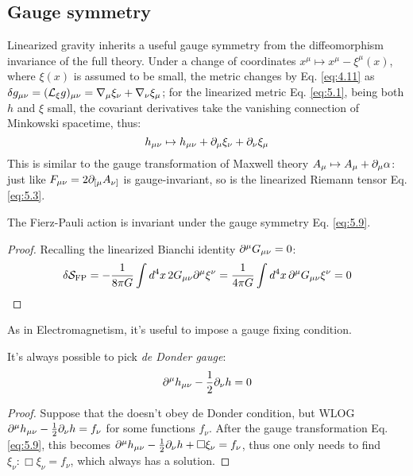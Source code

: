 \subsection{Gauge symmetry}

Linearized gravity inherits a useful gauge symmetry from the diffeomorphism invariance of the full theory. Under a change of coordinates $ x^\mu \mapsto x^\mu - \xi^\mu(x) $, where $ \xi(x) $ is assumed to be small, the metric changes by Eq. \ref{eq:4.11} as $ \delta g_{\mu \nu} = (\mathcal{L}_\xi g)_{\mu \nu} = \nabla_\mu \xi_\nu + \nabla_\nu \xi_\mu $; for the linearized metric Eq. \ref{eq:5.1}, being both $ h $ and $ \xi $ small, the covariant derivatives take the vanishing connection of Minkowski spacetime, thus:
\begin{equation}
  h_{\mu \nu} \mapsto h_{\mu \nu} + \partial_\mu \xi_\nu + \partial_\nu \xi_\mu
  \label{eq:5.9}
\end{equation}
This is similar to the gauge transformation of Maxwell theory $ A_\mu \mapsto A_\mu + \partial_\mu \alpha $: just like $ F_{\mu \nu} = 2 \partial_{[\mu} A_{\nu]} $ is gauge-invariant, so is the linearized Riemann tensor Eq. \ref{eq:5.3}.

\begin{proposition}
  The Fierz-Pauli action is invariant under the gauge symmetry Eq. \ref{eq:5.9}.
\end{proposition}
\begin{proof}
  Recalling the linearized Bianchi identity $ \partial^\mu G_{\mu \nu} = 0 $:
  \begin{equation*}
    \delta \mathcal{S}_{\text{FP}} = - \frac{1}{8\pi G} \int d^4 x\, 2 G_{\mu \nu} \partial^\mu \xi^\nu = \frac{1}{4\pi G} \int d^4 x\, \partial^\mu G_{\mu \nu} \xi^\nu = 0
  \end{equation*}
\end{proof}

As in Electromagnetism, it's useful to impose a gauge fixing condition.

\begin{proposition}
  It's always possible to pick \textit{de Donder gauge}:
  \begin{equation}
    \partial^\mu h_{\mu \nu} - \frac{1}{2} \partial_\nu h = 0
    \label{eq:5.10}
  \end{equation}
\end{proposition}
\begin{proof}
  Suppose that the doesn't obey de Donder condition, but WLOG $ \partial^\mu h_{\mu \nu} - \frac{1}{2} \partial_\nu h = f_\nu $ for some functions $ f_\nu $. After the gauge transformation Eq. \ref{eq:5.9}, this becomes $ \partial^\mu h_{\mu \nu} - \frac{1}{2} \partial_\nu h + \Box \xi_\nu = f_\nu $, thus one only needs to find $ \xi_\nu : \Box \xi_\nu = f_\nu $, which always has a solution.
\end{proof}

